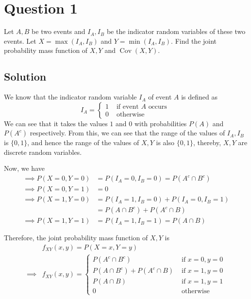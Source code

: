 \section*{Question 1}

Let \( A, B \) be two events and \( I_{A}, I_{B} \) be the indicator random variables of these two events.
Let \( X=\max \left(I_{A}, I_{B}\right) \) and \( Y=\min \left(I_{A}, I_{B}\right) \).
Find the joint probability mass function of \( X, Y \) and \( \operatorname{Cov}(X, Y) \).

\subsection*{Solution}

We know that the indicator random variable \( I_{A} \) of event \( A \) is defined as
\begin{equation*}
    I_{A}=\begin{cases}
        1 & \text { if event } A \text { occurs } \\
        0 & \text { otherwise }
    \end{cases}
\end{equation*}
We can see that it takes the values \( 1 \) and \( 0 \) with probabilities \( P(A) \) and \( P(A^{c}) \) respectively.
From this, we can see that the range of the values of \( I_{A}, I_{B} \) is \( \{0, 1\} \), and hence the range of the values of \( X, Y \) is also \( \{0, 1\} \), thereby, \( X, Y \) are discrete random variables.

Now, we have
\begin{align*}
    \implies
    P(X=0, Y=0)
     & =
    P(I_{A}=0, I_{B}=0)
    =
    P(A^{c} \cap B^{c})
    \\
    \implies
    P(X=0, Y=1)
     & =
    0
    \\
    \implies
    P(X=1, Y=0)
     & =
    P(I_{A}=1, I_{B}=0) + P(I_{A}=0, I_{B}=1)
    \\ & =
    P(A \cap B^{c}) + P(A^{c} \cap B)
    \\
    \implies
    P(X=1, Y=1)
     & =
    P(I_{A}=1, I_{B}=1)
    =
    P(A \cap B)
\end{align*}

Therefore, the joint probability mass function of \( X, Y \) is
\begin{align*}
     &
    f_{XY}(x, y)
    =
    P(X=x, Y=y)
    \\
    \implies
     &
    \boxed{
        f_{XY}(x, y)
        =
        \begin{cases}
            P(A^{c} \cap B^{c})
             &
            \text { if } x=0, y=0
            \\
            P(A \cap B^{c}) + P(A^{c} \cap B)
             & \text { if } x=1, y=0
            \\
            P(A \cap B)
             & \text { if } x=1, y=1
            \\
            0
             & \text { otherwise }
        \end{cases}
    }
\end{align*}
